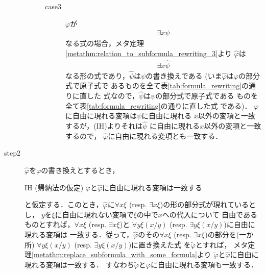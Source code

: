 \begin{metaprf}
\begin{description}
\begin{description}
\begin{description}
							\item[case3] $\varphi$が
								\begin{align}
									\exists x \psi
								\end{align}
								なる式の場合，メタ定理
								\ref{metathm:relation_to_subformula_rewriting_3}より
								$\widehat{\varphi}$は
								\begin{align}
									\exists x \widehat{\psi}
								\end{align}
								なる形の式であり，$\widehat{\psi}$は$\psi$の書き換えである
								(いま$\widehat{\varphi}$は$\varphi$の部分式で原子式で
								あるものを全て表\ref{tab:formula_rewriting}の通りに直した
								式なので，$\widehat{\psi}$は$\psi$の部分式で原子式である
								ものを全て表\ref{tab:formula_rewriting}の通りに直した式
								である)．
								$\varphi$に自由に現れる変項は$\psi$に自由に現れる
								$x$以外の変項と一致するが，(IH)よりそれは$\widehat{\psi}$
								に自由に現れる$x$以外の変項と一致するので，
								$\widehat{\varphi}$に自由に現れる変項とも一致する．
								\QED
						\end{description}
				\end{description}
			
			\item[step2]
				$\widehat{\varphi}$を$\varphi$の書き換えとするとき，
				\begin{itembox}[l]{IH (帰納法の仮定)}
					$\varphi$と$\widehat{\varphi}$に自由に現れる変項は一致する
				\end{itembox}
				と仮定する．このとき，$\widehat{\varphi}$に$\forall x \xi$ 
				(resp. $\exists x \xi$)の形の部分式が現れているとし，
				$y$を$\xi$に自由に現れない変項で$\xi$の中で$x$への代入について
				自由であるものとすれば，$\forall x \xi$ (resp. $\exists x \xi$)と
				$\forall y \xi(x/y)$ (resp. $\exists y \xi(x/y)$)に自由に現れる変項は
				一致する．従って，$\widehat{\varphi}$のその$\forall x \xi$ 
				(resp. $\exists x \xi$)の部分を(一か所)
				$\forall y \xi(x/y)$ (resp. $\exists y \xi(x/y)$)に置き換えた式
				を$\widetilde{\varphi}$とすれば，
				メタ定理\ref{metathm:replace_subformula_with_some_formula}より
				$\widetilde{\varphi}$と$\widehat{\varphi}$に自由に現れる変項は一致する．
				すなわち$\widetilde{\varphi}$と$\varphi$に自由に現れる変項も一致する．
				\QED
		\end{description}
	\end{metaprf}